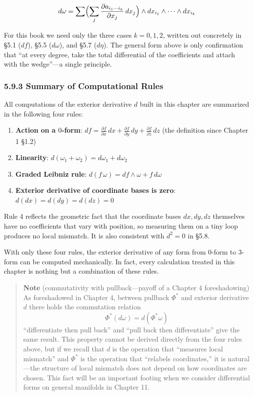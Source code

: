 \[d\omega = \sum \Bigl( \sum_j \frac{\partial a_{i_1\cdots i_k}}{\partial x_j}\,dx_j \Bigr) \wedge dx_{i_1}\wedge\cdots\wedge dx_{i_k}\]

For this book we need only the three cases \(k=0,1,2\), written out
concretely in §5.1 (\(df\)), §5.5 (\(d\omega\)), and §5.7 (\(d\eta\)).
The general form above is only confirmation that ``at every degree, take
the total differential of the coefficients and attach with the
wedge''---a single principle.

\hypertarget{summary-of-computational-rules}{%
\subsubsection{5.9.3 Summary of Computational
Rules}\label{summary-of-computational-rules}}

All computations of the exterior derivative \(d\) built in this chapter
are summarized in the following four rules:

\begin{enumerate}
\def\labelenumi{\arabic{enumi}.}
\tightlist
\item
  \textbf{Action on a $0$-form}:
  \(df = \frac{\partial f}{\partial x}\,dx + \frac{\partial f}{\partial y}\,dy + \frac{\partial f}{\partial z}\,dz\)
  (the definition since Chapter 1 §1.2)
\item
  \textbf{Linearity}: \(d(\omega_1 + \omega_2) = d\omega_1 + d\omega_2\)
\item
  \textbf{Graded Leibniz rule}:
  \(d(f\,\omega) = df \wedge \omega + f\,d\omega\)
\item
  \textbf{Exterior derivative of coordinate bases is zero}:
  \(d(dx) = d(dy) = d(dz) = 0\)
\end{enumerate}

Rule 4 reflects the geometric fact that the coordinate bases
\(dx, dy, dz\) themselves have no coefficients that vary with position,
so measuring them on a tiny loop produces no local mismatch. It is also
consistent with \(d^2=0\) in §5.8.

With only these four rules, the exterior derivative of any form from
\(0\)-form to \(3\)-form can be computed mechanically. In fact, every
calculation treated in this chapter is nothing but a combination of
these rules.

\begin{quote}
\textbf{Note} (commutativity with pullback---payoff of a Chapter 4
foreshadowing) As foreshadowed in Chapter 4, between pullback \(\Phi^*\)
and exterior derivative \(d\) there holds the commutation relation
\[\Phi^*(d\omega) = d(\Phi^*\omega)\] ``differentiate then pull back''
and ``pull back then differentiate'' give the same result. This property
cannot be derived directly from the four rules above, but if we recall
that \(d\) is the operation that ``measures local mismatch'' and
\(\Phi^*\) is the operation that ``relabels coordinates,'' it is
natural---the structure of local mismatch does not depend on how
coordinates are chosen. This fact will be an important footing when we
consider differential forms on general manifolds in Chapter 11.
\end{quote}

